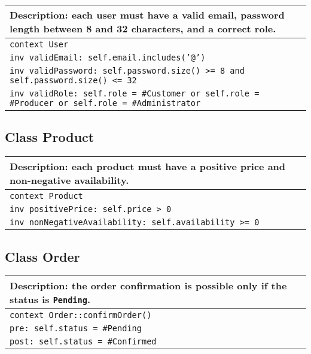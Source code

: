 \begin{table}[ht]
  \centering
  \begin{tabular}{p{}}
    \hline
    \textbf{Description:} each user must have a valid email, password length between 8 and 32 characters, and a correct role.\\
    \hline
    \texttt{context User}\\
    \texttt{inv validEmail: self.email.includes('@')}\\
    \texttt{inv validPassword: self.password.size() >= 8 and self.password.size() <= 32}\\
    \texttt{inv validRole: self.role = \#Customer or self.role = \#Producer or self.role = \#Administrator}\\
    \hline
  \end{tabular}
\end{table}

\newpage
\subsection{Class Product}

\begin{table}[ht]
  \centering
  \begin{tabular}{p{}}
    \hline
    \textbf{Description:} each product must have a positive price and non-negative availability.\\
    \hline
    \texttt{context Product}\\
    \texttt{inv positivePrice: self.price > 0}\\
    \texttt{inv nonNegativeAvailability: self.availability >= 0}\\
    \hline
  \end{tabular}
\end{table}

\subsection{Class Order}

\begin{table}[ht]
  \centering
  \begin{tabular}{p{}}
    \hline
    \textbf{Description:} the order confirmation is possible only if the status is \texttt{Pending}.\\
    \hline
    \texttt{context Order::confirmOrder()}\\
    \texttt{pre: self.status = \#Pending}\\
    \texttt{post: self.status = \#Confirmed}\\
    \hline
  \end{tabular}
\end{table}

